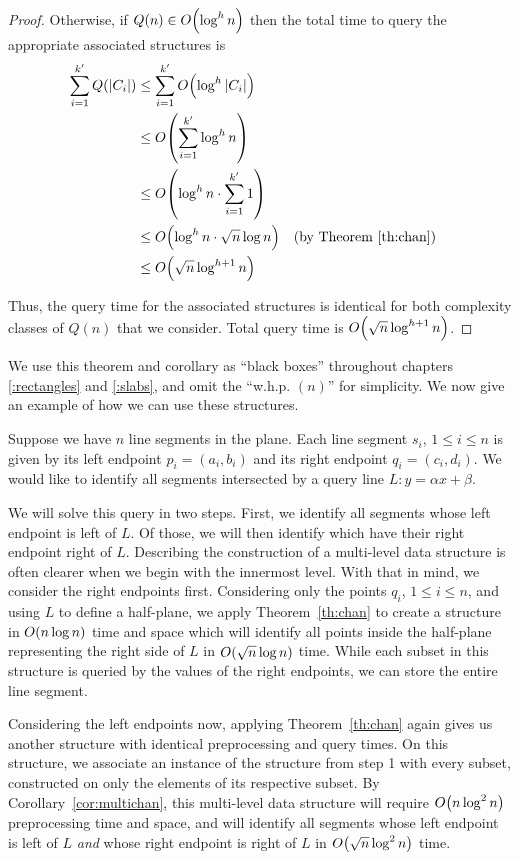 \begin{proof}
\noindent Otherwise, if $Q(n) \in O\!\left(\log^h{n}\right)$ then the total time to query the appropriate associated structures is
\begin{align*}
\sum_{i=1}^{k'}{Q(|C_i|)}
&\leq \sum_{i=1}^{k'}{\BigOh{\log^h{|C_i|}}} \\
%
&\leq \BigOh{\sum_{i=1}^{k'}{\log^h{n}}} \\
%
&\leq \BigOh{\log^h{n} \cdot \sum_{i=1}^{k'}{1}} \\
%
&\leq \BigOh{\log^h{n} \cdot \sqrt{n}\log{n}} && \text{(by Theorem \ref{th:chan})}\\
%
&\leq \BigOh{\sqrt{n}\log^{h+1}{n}} \\
\end{align*}

\noindent Thus, the query time for the associated structures is identical for both complexity classes of $Q(n)$ that we consider. 
Total query time is $O\!\left(\sqrt{n}\log^{h+1}{n}\right)$.
\end{proof}

We use this theorem and corollary as ``black boxes'' throughout chapters \ref{:rectangles} and \ref{:slabs}, and omit the ``w.h.p. $(n)$'' for simplicity.
We now give an example of how we can use these structures.

Suppose we have $n$ line segments in the plane.
Each line segment $s_i$, $1 \leq i \leq n$ is given by its left endpoint $p_i = (a_i, b_i)$ and its right endpoint $q_i = (c_i, d_i)$.
We would like to identify all segments intersected by a query line $L: y = \alpha x + \beta$.

We will solve this query in two steps.
First, we identify all segments whose left endpoint is left of $L$.
Of those, we will then identify which have their right endpoint right of $L$.
Describing the construction of a multi-level data structure is often clearer when we begin with the innermost level.
With that in mind, we consider the right endpoints first. 
Considering only the points $q_i$, $1 \leq i \leq n$, and using $L$ to define a half-plane, we apply 
Theorem~\ref{th:chan} to create a structure in $O\!\left(n\log{n}\right)$ time and space which will identify all points inside the half-plane representing the right side of $L$ in $O\!\left(\sqrt{n}\log{n}\right)$ time.  
While each subset in this structure is queried by the values of the right endpoints, we can store the entire line segment.

Considering the left endpoints now, applying Theorem~\ref{th:chan} again gives us another structure with identical preprocessing and query times. 
On this structure, we associate an instance of the structure from step 1 with every subset, constructed on only the elements of its respective subset.
By Corollary~\ref{cor:multichan}, this multi-level data structure will require $O\!\left(n\log^2{n}\right)$ preprocessing time and space, and will identify all segments whose left endpoint is left of $L$ \emph{and} whose right endpoint is right of $L$ in $O\!\left(\sqrt{n}\log^2{n}\right)$ time.
